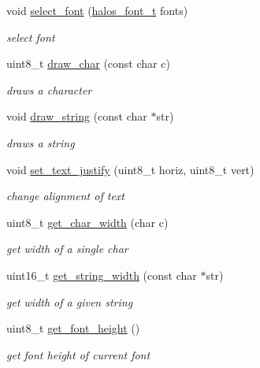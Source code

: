 \begin{CompactItemize}
void \hyperlink{group__hgdi__api_g325aa117e69b5614f75198308d116b69}{select\_\-font} (\hyperlink{group__hgdi__fonts_gec86a33a52fa97333da1074389df46a3}{halos\_\-font\_\-t} fonts)
\begin{CompactList}\small\item\em select font \item\end{CompactList}\item 
uint8\_\-t \hyperlink{group__hgdi__api_g1701f17a87fc25691c886ac822622491}{draw\_\-char} (const char c)
\begin{CompactList}\small\item\em draws a character \item\end{CompactList}\item 
void \hyperlink{group__hgdi__api_gfba093e7eb44678dacadfe498b6c6afa}{draw\_\-string} (const char $\ast$str)
\begin{CompactList}\small\item\em draws a string \item\end{CompactList}\item 
void \hyperlink{group__hgdi__api_gc5a88037655557ae99d1f1144c021f61}{set\_\-text\_\-justify} (uint8\_\-t horiz, uint8\_\-t vert)
\begin{CompactList}\small\item\em change alignment of text \item\end{CompactList}\item 
uint8\_\-t \hyperlink{group__hgdi__api_g3521241c59402aa97549fca14f20f544}{get\_\-char\_\-width} (char c)
\begin{CompactList}\small\item\em get width of a single char \item\end{CompactList}\item 
uint16\_\-t \hyperlink{group__hgdi__api_gdc6bc2359b35da24a9bcf4b9449d8902}{get\_\-string\_\-width} (const char $\ast$str)
\begin{CompactList}\small\item\em get width of a given string \item\end{CompactList}\item 
uint8\_\-t \hyperlink{group__hgdi__api_g13207a4e8f1f2299ddb9075d3cda4a82}{get\_\-font\_\-height} ()
\begin{CompactList}\small\item\em get font height of current font \item\end{CompactList}\item 

\end{CompactItemize}
